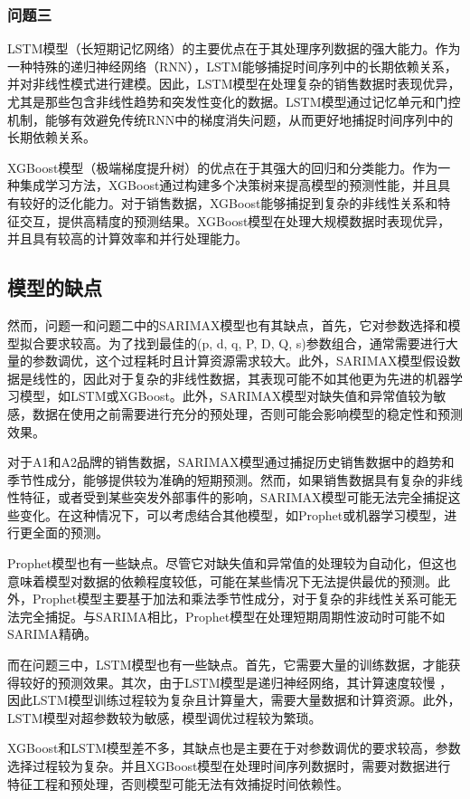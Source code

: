 \documentclass[a4paper]{article}
\begin{document}
	\subsubsection{问题三}
	LSTM模型（长短期记忆网络）的主要优点在于其处理序列数据的强大能力。作为一种特殊的递归神经网络（RNN），LSTM能够捕捉时间序列中的长期依赖关系，并对非线性模式进行建模。因此，LSTM模型在处理复杂的销售数据时表现优异，尤其是那些包含非线性趋势和突发性变化的数据。LSTM模型通过记忆单元和门控机制，能够有效避免传统RNN中的梯度消失问题，从而更好地捕捉时间序列中的长期依赖关系。
	
	XGBoost模型（极端梯度提升树）的优点在于其强大的回归和分类能力。作为一种集成学习方法，XGBoost通过构建多个决策树来提高模型的预测性能，并且具有较好的泛化能力。对于销售数据，XGBoost能够捕捉到复杂的非线性关系和特征交互，提供高精度的预测结果。XGBoost模型在处理大规模数据时表现优异，并且具有较高的计算效率和并行处理能力。
	
	\subsection{模型的缺点}
	然而，问题一和问题二中的SARIMAX模型也有其缺点，首先，它对参数选择和模型拟合要求较高。为了找到最佳的(p, d, q, P, D, Q, s)参数组合，通常需要进行大量的参数调优，这个过程耗时且计算资源需求较大。此外，SARIMAX模型假设数据是线性的，因此对于复杂的非线性数据，其表现可能不如其他更为先进的机器学习模型，如LSTM或XGBoost。此外，SARIMAX模型对缺失值和异常值较为敏感，数据在使用之前需要进行充分的预处理，否则可能会影响模型的稳定性和预测效果。

	对于A1和A2品牌的销售数据，SARIMAX模型通过捕捉历史销售数据中的趋势和季节性成分，能够提供较为准确的短期预测。然而，如果销售数据具有复杂的非线性特征，或者受到某些突发外部事件的影响，SARIMAX模型可能无法完全捕捉这些变化。在这种情况下，可以考虑结合其他模型，如Prophet或机器学习模型，进行更全面的预测。
	
	Prophet模型也有一些缺点。尽管它对缺失值和异常值的处理较为自动化，但这也意味着模型对数据的依赖程度较低，可能在某些情况下无法提供最优的预测。此外，Prophet模型主要基于加法和乘法季节性成分，对于复杂的非线性关系可能无法完全捕捉。与SARIMA相比，Prophet模型在处理短期周期性波动时可能不如SARIMA精确。
	
	而在问题三中，LSTM模型也有一些缺点。首先，它需要大量的训练数据，才能获得较好的预测效果。其次，由于LSTM模型是递归神经网络，其计算速度较慢
	，因此LSTM模型训练过程较为复杂且计算量大，需要大量数据和计算资源。此外，LSTM模型对超参数较为敏感，模型调优过程较为繁琐。
	
	XGBoost和LSTM模型差不多，其缺点也是主要在于对参数调优的要求较高，参数选择过程较为复杂。并且XGBoost模型在处理时间序列数据时，需要对数据进行特征工程和预处理，否则模型可能无法有效捕捉时间依赖性。
\end{document}
